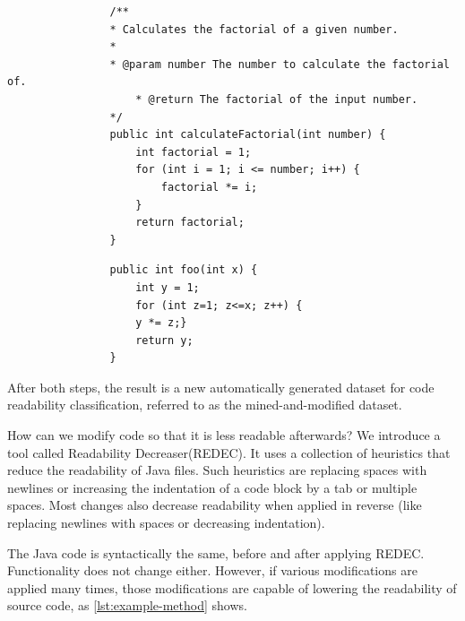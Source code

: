 \documentclass[%
class=scrreprt,
chapterprefix=false,%
open=right,%
twoside=false,%
paper=a4,%
logofile={Logo\_zentral\_farbig\_EN.png},%
thesistype=master,%
UKenglish,%
]{se2thesis}
\theoremstyle{definition}
\newcommand{\RDH}{Readability Decreaser\xspace}
\newcommand{\rdh}{REDEC\xspace}
\newcommand{\RDHa}{\RDH (\rdh)\xspace} %
\begin{document}
	\begin{listing}[tb]
		\begin{sublisting}{\linewidth}
			\begin{verbatim}
				/**
				* Calculates the factorial of a given number.
				*
				* @param number The number to calculate the factorial of.
					* @return The factorial of the input number.
				*/
				public int calculateFactorial(int number) {
					int factorial = 1;
					for (int i = 1; i <= number; i++) {
						factorial *= i;
					}
					return factorial;
				}
			\end{verbatim}
			\caption{An example of a simple and well readable Java method.}
			\label{lst:example-method-well}
		\end{sublisting}		
		\begin{sublisting}{\linewidth}
			\begin{verbatim}
				public int foo(int x) {
					int y = 1;
					for (int z=1; z<=x; z++) {
					y *= z;}
					return y;
				}
			\end{verbatim}
			\caption{The same example as in \autoref{lst:example-method-well} but modified for poor readability.}
			\label{lst:example-method-badly}
		\end{sublisting}
		\caption{Well readable (\autoref{lst:example-method-well}) vs. poorly readable (\autoref{lst:example-method-badly}) code.}
		\label{lst:example-method}
	\end{listing}
	
	After both steps, the result is a new automatically generated dataset for code readability classification, referred to as the mined-and-modified dataset.
	
	How can we modify code so that it is less readable afterwards? We introduce a tool called \RDHa. It uses a collection of heuristics that reduce the readability of Java files. Such heuristics are replacing spaces with newlines or increasing the indentation of a code block by a tab or multiple spaces. Most changes also decrease readability when applied in reverse (like replacing newlines with spaces or decreasing indentation).
	
	The Java code is syntactically the same, before and after applying \rdh. Functionality does not change either. However, if various modifications are applied many times, those modifications are capable of lowering the readability of source code, as \autoref{lst:example-method} shows.
\end{document}

